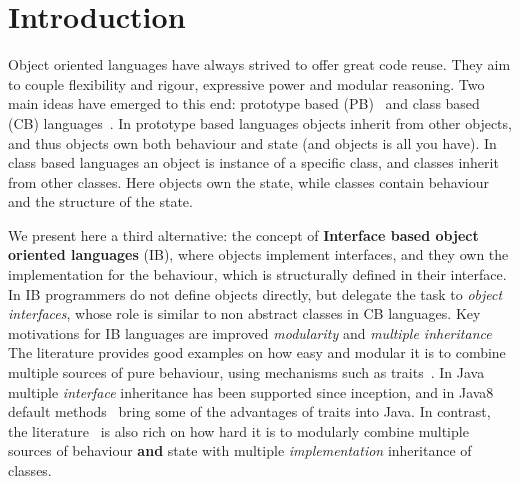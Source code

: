 \section{Introduction}\label{sec:intro}



Object oriented languages have always strived to offer great code reuse.
They aim to couple flexibility and rigour, expressive power and
modular reasoning.  Two main ideas have emerged to this end: prototype
based (PB)~\cite{} and class based (CB) languages~\cite{}.  In prototype based
languages objects inherit from other objects, and thus objects own
both behaviour and state (and objects is all you have).
In class based languages an object is instance of a specific class,
and classes inherit from other classes.  Here objects own the state,
while classes contain behaviour and the structure of the state.

We present here a third alternative: the concept of \textbf{Interface
  based object oriented languages} (IB), where objects implement
interfaces, and they own the implementation for the behaviour, which
is structurally defined in their interface. In IB programmers do not define objects directly, but
delegate the task to \emph{object interfaces}, whose role is similar
to non abstract classes in CB languages. Key motivations for IB
languages are improved \emph{modularity} and \emph{multiple inheritance}~  The literature
provides good examples on how easy and modular it is to combine
multiple sources of pure behaviour, using mechanisms such as
traits~\cite{scharli03traits}. In Java multiple \emph{interface} inheritance has been
supported since inception, and in Java8 default methods~\cite{} bring some of
the advantages of traits into Java. In contrast, the literature~\cite{} is
also rich on how hard it is to modularly combine multiple sources of
behaviour \textbf{and} state with multiple \emph{implementation}
inheritance of classes.

